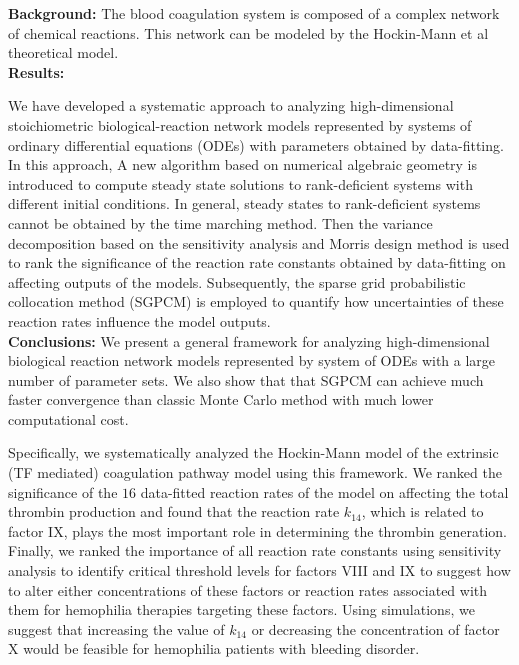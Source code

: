 \def\CTeXPreproc{Created by ctex v0.2.11, don't edit!}{\bf Background:} The blood coagulation system is composed of a
complex network of chemical reactions. This network can be modeled
by the Hockin-Mann et al theoretical model.
\\{\bf Results:}

We have developed a systematic approach to analyzing high-dimensional stoichiometric
biological-reaction network models represented by systems of ordinary differential equations (ODEs) with parameters obtained by data-fitting.
In this approach, A new algorithm based on numerical algebraic
geometry  is introduced to compute steady state solutions to rank-deficient
systems with different initial
conditions.  In general, steady states to rank-deficient systems cannot be obtained by the time marching method.
Then the variance decomposition based on the sensitivity
analysis and Morris design method is used to rank the significance of the reaction rate constants obtained by data-fitting on affecting outputs of the models.
Subsequently, the sparse grid
probabilistic collocation method (SGPCM) is employed to quantify how
uncertainties of these reaction rates influence the model outputs.
\\{\bf Conclusions:} %
We present a general framework for analyzing high-dimensional
biological reaction network models represented by system of ODEs with a large number of parameter sets.
We also show that that SGPCM can achieve much faster convergence than classic Monte Carlo
method with much lower computational cost.

Specifically, we systematically analyzed the Hockin-Mann model of the extrinsic
(TF mediated) coagulation pathway model using this framework.
We ranked the significance of the $16$ data-fitted reaction rates of the model on affecting the total thrombin production and found that the reaction rate $k_{14}$, which is related to
factor IX, plays the  most important role in determining the thrombin generation.
Finally, we ranked the
importance of all reaction rate constants using sensitivity
analysis to identify critical threshold levels for factors VIII and
IX to  suggest how to alter either concentrations of these factors or
 reaction rates associated with them for hemophilia therapies targeting these
 factors. Using simulations, we suggest that increasing the value of
$k_{14}$ or decreasing the concentration of factor X would be feasible for hemophilia patients with bleeding disorder.
